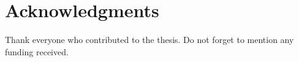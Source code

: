 % 
\chapter*{Acknowledgments}

Thank everyone who contributed to the thesis. Do not forget to mention any funding received.  